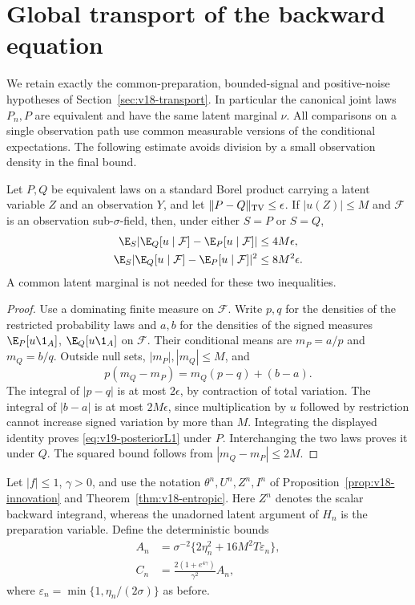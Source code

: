 \section{Global transport of the backward equation}
\label{sec:v19-global}
We retain exactly the common-preparation, bounded-signal and positive-noise
hypotheses of Section~\ref{sec:v18-transport}. In particular the canonical
joint laws $P_n,P$ are equivalent and have the same latent marginal $\nu$.
All comparisons on a single observation path use common measurable versions
of the conditional expectations. The following estimate avoids division by
a small observation density in the final bound.

\begin{lemma}
\label{lem:v19-posterior}
Let $P,Q$ be equivalent laws on a standard Borel product carrying a latent
variable $Z$ and an observation $Y$, and let
$\|P-Q\|_{\rm TV}\le\epsilon$. If $|u(Z)|\le M$ and $\mathcal F$ is
an observation sub-$\sigma$-field, then, under either $S=P$ or $S=Q$,
\begin{align}
 \E_S|\E_Q[u\mid\mathcal F]-\E_P[u\mid\mathcal F]|
       &\le4M\epsilon,\label{eq:v19-posteriorL1}\\
 \E_S|\E_Q[u\mid\mathcal F]-\E_P[u\mid\mathcal F]|^2
       &\le8M^2\epsilon.\label{eq:v19-posteriorL2}
\end{align}
A common latent marginal is not needed for these two inequalities.
\end{lemma}
\begin{proof}
Use a dominating finite measure on $\mathcal F$. Write $p,q$ for the
densities of the restricted probability laws and $a,b$ for the densities
of the signed measures $\E_P[u\1_A]$, $\E_Q[u\1_A]$ on $\mathcal F$.
Their conditional means are $m_P=a/p$ and $m_Q=b/q$. Outside null sets,
$|m_P|,|m_Q|\le M$, and
\[
 p(m_Q-m_P)=m_Q(p-q)+(b-a).
\]
The integral of $|p-q|$ is at most $2\epsilon$, by contraction of total
variation. The integral of $|b-a|$ is at most $2M\epsilon$, since
multiplication by $u$ followed by restriction cannot increase signed
variation by more than $M$. Integrating the displayed identity proves
\eqref{eq:v19-posteriorL1} under $P$. Interchanging the two laws proves it
under $Q$. The squared bound follows from $|m_Q-m_P|\le2M$.
\end{proof}

Let $|f|\le1$, $\gamma>0$, and use the notation $\theta^n,U^n,Z^n,I^n$
of Proposition~\ref{prop:v18-innovation} and
Theorem~\ref{thm:v18-entropic}. Here $Z^n$ denotes the scalar backward
integrand, whereas the unadorned latent argument of $H_n$ is the preparation
variable. Define the deterministic bounds
\begin{align}
 A_n&=\sigma^{-2}\{2\eta_n^2+16M^2T\varepsilon_n\},
       \label{eq:v19-An}\\
 C_n&=\frac{2(1+e^{4\gamma})}{\gamma^2}A_n,
       \label{eq:v19-Cn}
\end{align}
where $\varepsilon_n=\min\{1,\eta_n/(2\sigma)\}$ as before.


